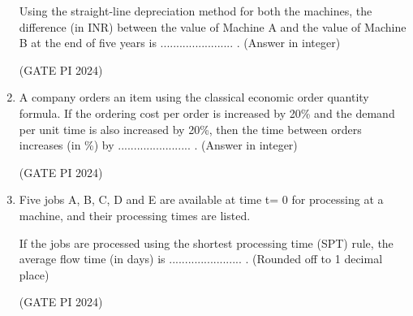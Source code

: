 \documentclass[journal,12pt,onecolumn]{IEEEtran}
\theoremstyle{remark}
\begin{document}
\begin{enumerate}
Using the straight-line depreciation method for both the machines, the difference (in INR) between the value of Machine A and the value of Machine B at the end of five years is ....................... . (Answer in integer)

\hfill (GATE PI 2024)

\item A company orders an item using the classical economic order quantity formula. If the ordering cost per order is increased by 20\% and the demand per unit time is also increased by 20\%, then the time between orders increases (in \%) by ....................... . (Answer in integer)

\hfill (GATE PI 2024)

\item Five jobs A, B, C, D and E are available at time t= 0 for processing at a machine, and their processing times are listed.



If the jobs are processed using the shortest processing time (SPT) rule, the average flow time (in days) is ....................... . (Rounded off to 1 decimal place)

\hfill (GATE PI 2024)













\end{enumerate}
\end{document}

